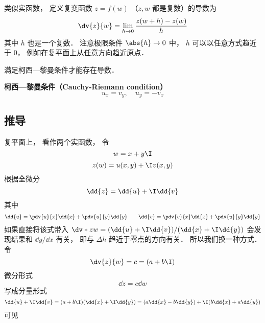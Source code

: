 
类似实函数， 定义复变函数 $z = f(w)$ （$z, w$ 都是复数）的导数为
\begin{equation}
\dv{z}{w} = \lim_{h\to 0} \frac{z(w + h) - z(w)}{h}
\end{equation}
其中 $h$ 也是一个复数． 注意极限条件 $\abs{h}\to 0$ 中， $h$ 可以以任意方式趋近于 $0$， 例如在复平面上从任意方向趋近原点．

满足柯西—黎曼条件才能存在导数．

\textbf{柯西—黎曼条件（Cauchy-Riemann condition）}
\begin{equation}\label{CauRie_eq1}
u_{x}=v_{y}, \quad u_{y}=-v_{x}
\end{equation}


\subsection{推导}
复平面上， 看作两个实函数， 令
\begin{equation}
w = x + y\I
\end{equation}
\begin{equation}
z(w) = u(x, y) + \I v(x, y)
\end{equation}
根据全微分
\begin{equation}
\dd{z} = \dd{u} + \I \dd{v}
\end{equation}
其中
\begin{equation}
\dd{u} = \pdv{u}{x} \dd{x} + \pdv{u}{y} \dd{y} \qquad
\dd{v} = \pdv{v}{x} \dd{x} + \pdv{u}{y} \dd{y}
\end{equation}
如果直接将该式带入 $\dv*{z}{w} = (\dd{u} + \I \dd{v})/(\dd{x} + \I \dd{y})$ 会发现结果和 $\dd{y}/\dd{x}$ 有关， 即与 $\Delta h$ 趋近于零点的方向有关． 所以我们换一种方式． 令
\begin{equation}
\dv{z}{w} = c = (a + b\I)
\end{equation}
微分形式
\begin{equation}
\dd{z} = c\dd{w}
\end{equation}
写成分量形式
\begin{equation}
\dd{u} + \I \dd{v} = (a + b\I)(\dd{x} + \I\dd{y}) = (a \dd{x} - b\dd{y}) + \I (b \dd{x} + a\dd{y})
\end{equation}
可见
\begin{equation}

\end{equation}

